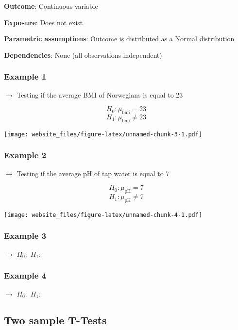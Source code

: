 \documentclass[12pt,]{article}
\begin{document}
\textbf{Outcome}: Continuous variable

\textbf{Exposure}: Does not exist

\textbf{Parametric assumptions}: Outcome is distributed as a Normal
distribution

\textbf{Dependencies}: None (all observations independent)

\subsubsection{Example 1}\label{example-1}

\(\rightarrow\) Testing if the average BMI of Norwegians is equal to 23

\[H_0: \mu_{\text{bmi}} = 23\] \[H_1: \mu_{\text{bmi}} \ne 23\]

\texttt{[image: website\_files/figure-latex/unnamed-chunk-3-1.pdf]}

\newpage

\subsubsection{Example 2}\label{example-2}

\(\rightarrow\) Testing if the average pH of tap water is equal to 7

\[H_0: \mu_{\text{pH}} = 7\] \[H_1: \mu_{\text{pH}} \ne 7\]

\texttt{[image: website\_files/figure-latex/unnamed-chunk-4-1.pdf]}

\subsubsection{Example 3}\label{example-3}

\(\rightarrow\) \hfill \break
\hfill \break
\hfill \break
\(H_0:\) \hfill \break
\hfill \break
\hfill \break
\(H_1:\)

\newpage 

\subsubsection{Example 4}\label{example-4}

\(\rightarrow\) \hfill \break
\hfill \break
\hfill \break
\(H_0:\) \hfill \break
\hfill \break
\hfill \break
\(H_1:\)

\subsection{Two sample T-Tests}\label{two-sample-t-tests}
\end{document}
